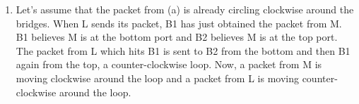 \documentclass[12pt]{article}
\begin{document}
\begin{enumerate}
\begin{enumerate}
\item %
Let's assume that the packet from (a) is already circling clockwise around the bridges. When L sends its packet, B1 has just obtained the packet from M. B1 believes M is at the bottom port and B2 believes M is at the top port. The packet from L which hits B1 is sent to B2 from the bottom and then B1 again from the top, a counter-clockwise loop. Now, a packet from M is moving clockwise around the loop and a packet from L is moving counter-clockwise around the loop.
\end{enumerate}
\end{enumerate}
\end{document}
